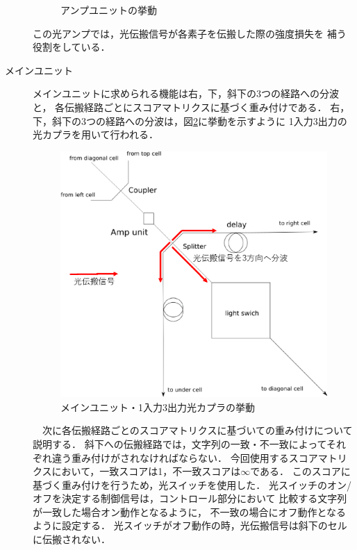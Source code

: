 \begin{description}
\begin{figure}[t!]
\begin{center}
\caption{アンプユニットの挙動}
\label{fig:ampunit}
\end{center}
\end{figure}
この光アンプでは，光伝搬信号が各素子を伝搬した際の強度損失を
補う役割をしている．
\item[メインユニット]
メインユニットに求められる機能は右，下，斜下の3つの経路への分波と，
各伝搬経路ごとにスコアマトリクスに基づく重み付けである．
右，下，斜下の3つの経路への分波は，図\ref{fig:mainunit_s}に挙動を示すように
1入力3出力の光カプラを用いて行われる．\\
\begin{figure}[t!]
\begin{center}
\includegraphics[keepaspectratio,scale=0.4]{fig/3/lightracelogic_cell_6_3.eps}
\caption{メインユニット・1入力3出力光カプラの挙動}
\label{fig:mainunit_s}
\end{center}
\end{figure}
\ \ 次に各伝搬経路ごとのスコアマトリクスに基づいての重み付けについて説明する．
斜下への伝搬経路では，文字列の一致・不一致によってそれぞれ違う重み付けがされなければならない．
今回使用するスコアマトリクスにおいて，一致スコアは1，不一致スコアは$\infty$である．
このスコアに基づく重み付けを行うため，光スイッチを使用した．
光スイッチのオン/オフを決定する制御信号は，コントロール部分において
比較する文字列が一致した場合オン動作となるように，
不一致の場合にオフ動作となるように設定する．
光スイッチがオフ動作の時，光伝搬信号は斜下のセルに伝搬されない．

\end{description}
